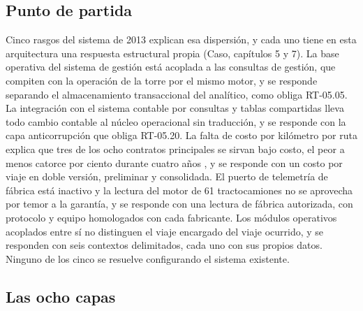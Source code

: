 \subsection{Punto de partida}\label{sec:4-partida}

Cinco rasgos del sistema de 2013 explican esa dispersión, y cada uno tiene en esta arquitectura una
respuesta estructural propia (Caso, capítulos 5 y 7). La base operativa del sistema de gestión está
acoplada a las consultas de gestión, que compiten con la operación de la torre por el mismo motor, y se
responde separando el almacenamiento transaccional del analítico, como obliga RT-05.05. La integración
con el sistema contable por consultas y tablas compartidas lleva todo cambio contable al núcleo
operacional sin traducción, y se responde con la capa anticorrupción que obliga RT-05.20. La falta de
costo por kilómetro por ruta explica que tres de los ocho contratos principales se sirvan bajo costo,
el peor a menos catorce por ciento durante cuatro años , y se responde con un
costo por viaje en doble versión, preliminar y consolidada. El puerto de telemetría de fábrica está
inactivo y la lectura del motor de 61 tractocamiones no se aprovecha por temor a la garantía, y se
responde con una lectura de fábrica autorizada, con protocolo y equipo homologados con cada fabricante.
Los módulos operativos acoplados entre sí no distinguen el viaje encargado del viaje ocurrido, y se
responden con seis contextos delimitados, cada uno con sus propios datos. Ninguno de los cinco se
resuelve configurando el sistema existente.

\subsection{Las ocho capas}\label{sec:4-capas}

